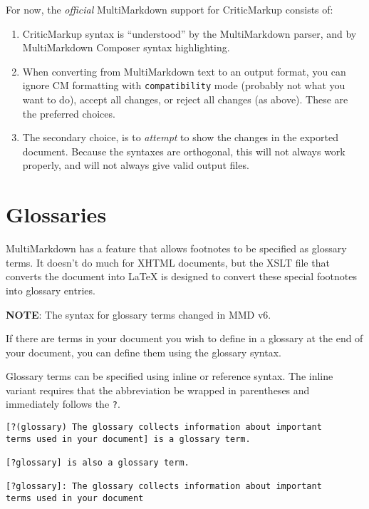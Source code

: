 For now, the \emph{official} MultiMarkdown support for CriticMarkup consists of:

\begin{enumerate}
\item CriticMarkup syntax is ``understood'' by the MultiMarkdown parser, and by MultiMarkdown Composer syntax highlighting.

\item When converting from MultiMarkdown text to an output format, you can ignore CM formatting with \texttt{compatibility} mode (probably not what you want to do), accept all changes, or reject all changes (as above). These are the preferred choices.

\item The secondary choice, is to \emph{attempt} to show the changes in the exported document. Because the syntaxes are orthogonal, this will not always work properly, and will not always give valid output files.

\end{enumerate}

\section{Glossaries }
\label{glossaries}

MultiMarkdown has a feature that allows footnotes to be specified as glossary terms. It doesn't do much for XHTML documents, but the XSLT file that converts the document into LaTeX is designed to convert these special footnotes into glossary entries.

\textbf{NOTE}: The syntax for glossary terms changed in \gls{MMD} v6.

If there are terms in your document you wish to define in a \gls{glossary} at the end of your document, you can define them using the glossary syntax.

Glossary terms can be specified using inline or reference syntax. The inline variant requires that the abbreviation be wrapped in parentheses and immediately follows the \texttt{?}.

\begin{verbatim}
[?(glossary) The glossary collects information about important
terms used in your document] is a glossary term.

[?glossary] is also a glossary term.

[?glossary]: The glossary collects information about important
terms used in your document
\end{verbatim}

